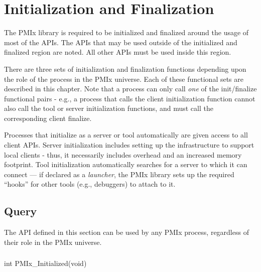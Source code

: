 \chapter{Initialization and Finalization}
\label{chap:api_init}

The \ac{PMIx} library is required to be initialized and finalized around the usage of most of the \acp{API}.
The \acp{API} that may be used outside of the initialized and finalized region are noted.
All other \acp{API} must be used inside this region.

There are three sets of initialization and finalization functions depending upon the role of the process in the \ac{PMIx} universe.
Each of these functional sets are described in this chapter.
Note that a process can only call \textit{one} of the init/finalize functional pairs - e.g., a process that calls the client initialization function cannot also call the tool or server initialization functions, and must call the corresponding client finalize.

\adviceuserstart
Processes that initialize as a server or tool automatically are given access to all client \acp{API}.
Server initialization includes setting up the infrastructure to support local clients - thus, it necessarily includes overhead and an increased memory footprint.
Tool initialization automatically searches for a server to which it can connect --- if declared as a \textit{launcher}, the \ac{PMIx} library sets up the required ``hooks'' for other tools (e.g., debuggers) to attach to it.
\adviceuserend


\section{Query}
\label{chap:api_init:general}

The \ac{API} defined in this section can be used by any \ac{PMIx} process, regardless of their role in the \ac{PMIx} universe.

\subsection{}

\format

\cspecificstart
\begin{codepar}
int PMIx_Initialized(void)
\end{codepar}
\cspecificend

